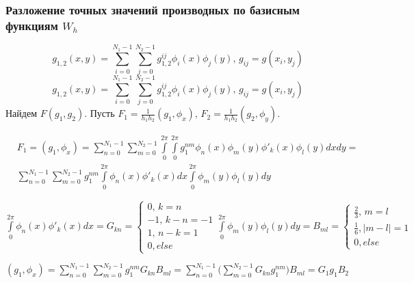 \documentclass{article}
\begin{document}
\subsubsection{Разложение точных значений производных по базисным функциям $W_h$}
$$g_{1,2}(x,y) = \sum \limits_{i=0}^{N_1-1} \sum \limits_{j=0}^{N_2-1}g_{1,2}^{ij}\phi_i(x)\phi_j(y),\, g_{ij} = g(x_i,y_j)$$
$$g_{1,2}(x,y) = \sum \limits_{i=0}^{N_1-1} \sum \limits_{j=0}^{N_2-1}g_{1,2}^{ij}\phi_i(x)\phi_j(y),\, g_{ij} = g(x_i,y_j)$$
Найдем $F(g_1,g_2)$. 
Пусть $F_1 = \frac{1}{h_1h_2}(g_1,\phi_x),\, F_2 = \frac{1}{h_1h_2}(g_2, \phi_y)$.

\begin{align*}
&F_1 = (g_1, \phi_x) = \sum \limits_{n = 0}^{N_1 - 1} \sum \limits_{m = 0}^{N_2 - 1} \int \limits_0^{2\pi}\int \limits_0^{2\pi} g_1^{nm}\phi_n(x)\phi_m(y) \phi'_k(x) \phi_l(y) dx dy =\\& 
\sum \limits_{n = 0}^{N_1 - 1} \sum \limits_{m = 0}^{N_2 - 1} g_1^{nm} \int \limits_0^{2\pi} \phi_n(x) \phi'_k(x) dx \int \limits_0^{2\pi} \phi_m(y) \phi_l(y) dy
\end{align*}

$\int \limits_0^{2\pi} \phi_n(x) \phi'_k(x) dx  = G_{kn} =
\begin{cases} 
    0, \, k = n \\ 
    -1, \, k - n = -1 \\
    1, \, n - k = 1 \\
    0, else
\end{cases}
\int \limits_0^{2\pi} \phi_m(y) \phi_l(y) dy = B_{ml} =
\begin{cases}
    \frac{2}{3}, \, m = l \\
    \frac{1}{6}, \mid m-l \mid = 1\\
    0, else
\end{cases}$

$(g_1, \phi_x) = \sum \limits_{n = 0}^{N_1 - 1} \sum \limits_{m = 0}^{N_2 - 1} g_1^{nm} G_{kn} B_{ml} = 
\sum \limits_{n = 0}^{N_1 - 1} \big(\sum \limits_{m = 0}^{N_2 - 1} G_{kn} g_1^{nm} \big) B_{ml} = G_1 g_1 B_2
$
\end{document}
